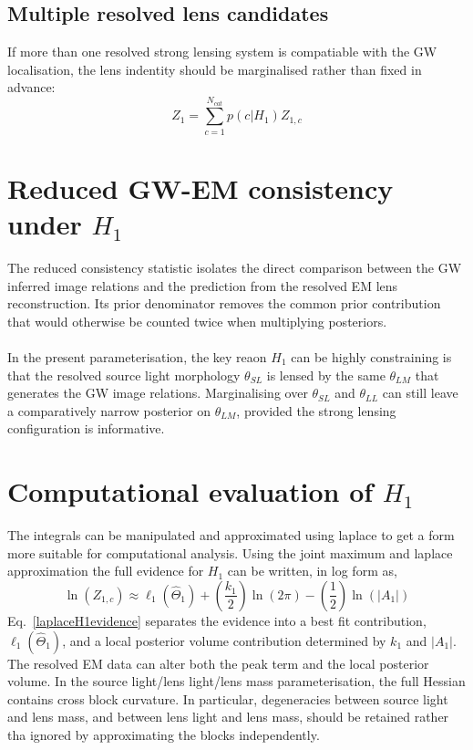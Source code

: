 \documentclass[pdflatex,sn-mathphys-num]{sn-jnl}%
\theoremstyle{thmstyleone}%
\theoremstyle{thmstyletwo}%
\theoremstyle{thmstylethree}%
\begin{document}
\subsection{Multiple resolved lens candidates}

If more than one resolved strong lensing system is compatiable with the GW localisation, the lens indentity should be marginalised rather than fixed in advance:
\begin{equation}
Z_1 = \sum_{c=1}^{N_{cat}}p(c|H_1)Z_{1,c}
\end{equation}

\section{Reduced GW-EM consistency under $H_1$}

The reduced consistency statistic isolates the direct comparison between the GW inferred image relations and the prediction from the resolved EM lens reconstruction.
Its prior denominator removes the common prior contribution that would otherwise be counted twice when multiplying posteriors.\\
\\In the present parameterisation, the key reaon $H_1$ can be highly constraining is that the resolved source light morphology $\theta_{SL}$ is lensed by the same $\theta_{LM}$ that generates the GW image relations.
Marginalising over $\theta_{SL}$ and $\theta_{LL}$ can still leave a comparatively narrow posterior on $\theta_{LM}$, provided the strong lensing configuration is informative.

\section{Computational evaluation of $H_1$}

The integrals can be manipulated and approximated using laplace to get a form more suitable for computational analysis.
Using the joint maximum and laplace approximation the full evidence for $H_1$ can be written, in log form as,
\begin{equation}
\label{laplaceH1evidence}
\ln(Z_{1,c}) \approx \ell_1(\hat\Theta_1)+(\frac{k_1}{2})\ln(2\pi)-(\frac{1}{2})\ln(|A_1|)
\end{equation}
Eq.~\eqref{laplaceH1evidence} separates the evidence into a best fit contribution, $\ell_1(\hat\Theta_1)$, and a local posterior volume contribution determined by $k_1$ and $|A_1|$.
The resolved EM data can alter both the peak term and the local posterior volume.
In the source light/lens light/lens mass parameterisation, the full Hessian contains cross block curvature.
In particular, degeneracies between source light and lens mass, and between lens light and lens mass, should be retained rather tha ignored by approximating the blocks independently.
\end{document}
